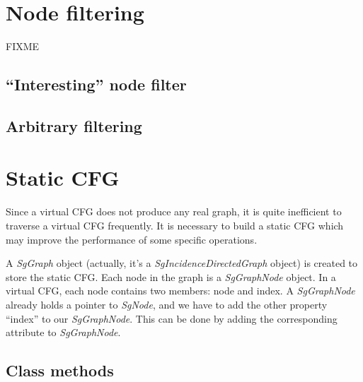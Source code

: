 \section{Node filtering}

FIXME

\subsection{``Interesting'' node filter}
\label{interesting_node_filter}

\subsection{Arbitrary filtering}

\section{Static CFG}

Since a virtual CFG does not produce any real graph, it is quite inefficient to
traverse a virtual CFG frequently. It is necessary to build a static CFG which may
improve the performance of some specific operations. 

A \textit{SgGraph} object (actually, it's a \textit{SgIncidenceDirectedGraph} object) is created to 
store the static CFG. Each node in the graph is a \textit{SgGraphNode} object. In a virtual 
CFG, each node contains two members: node and index. A \textit{SgGraphNode} already holds a 
pointer to \textit{SgNode}, and we have to add the other property ``index'' to our \textit{SgGraphNode}.
This can be done by adding the corresponding attribute to \textit{SgGraphNode}.

\subsection{Class methods}

